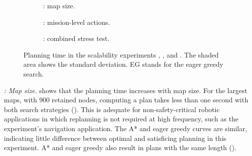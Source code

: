 \begin{figure}[tbp]
    \centering
    \captionsetup[subfigure]{justification=centering}%
    \begin{subfigure}[t]{0.48\linewidth}
        \centering
        {%
        }
        \caption{\Sone: map size.}%
        \label{planta:plot:s1_planning_time}
    \end{subfigure}\hfill
    \begin{subfigure}[t]{0.48\linewidth}
        \centering
        
        \caption{\Sfour: mission-level actions.}%
        \label{planta:plot:s4_planning_time}
    \end{subfigure}

    \medskip
    \begin{subfigure}[t]{0.48\linewidth}
        \centering
        
        \caption{\Sfive: combined stress test.}%
        \label{planta:plot:s5_planning_time}
    \end{subfigure}
    \caption{Planning time in the scalability experiments \Sone, \Sfour, and \Sfive. The shaded area shows the standard deviation. EG stands for the eager greedy search.}%
    \label{planta:fig:scalability_time}
\end{figure}

\emph{\Sone: Map size.}
 shows that the planning time increases with map size. For the largest maps, with $900$ retained nodes, computing a plan takes less than one second with both search strategies (). This is adequate for non-safety-critical robotic applications in which replanning is not required at high frequency, such as the experiment's navigation application. The A* and eager greedy curves are similar, indicating little difference between optimal and satisficing planning in this experiment. A* and eager greedy also result in plans with the same length ().

